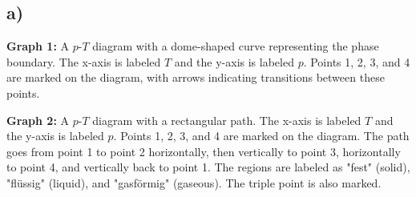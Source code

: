 

\subsection*{a)}

\textbf{Graph 1:} A $p$-$T$ diagram with a dome-shaped curve representing the phase boundary. The x-axis is labeled $T$ and the y-axis is labeled $p$. Points 1, 2, 3, and 4 are marked on the diagram, with arrows indicating transitions between these points.

\textbf{Graph 2:} A $p$-$T$ diagram with a rectangular path. The x-axis is labeled $T$ and the y-axis is labeled $p$. Points 1, 2, 3, and 4 are marked on the diagram. The path goes from point 1 to point 2 horizontally, then vertically to point 3, horizontally to point 4, and vertically back to point 1. The regions are labeled as "fest" (solid), "flüssig" (liquid), and "gasförmig" (gaseous). The triple point is also marked.